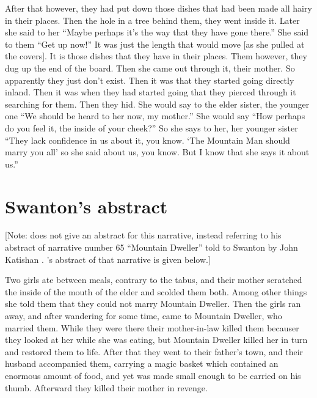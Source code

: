 \begin{pairs}
\begin{Rightside}
After that however, they had put down those dishes that had been made all hairy in their places.
Then the hole in a tree behind them, they went inside it.
\pend
\pstart
{}Later she said to her
\qqk{}“Maybe perhaps it’s the way that they have gone there.”
She said to them
\qqk{}“Get up now!”
It was just the length that would move [as she pulled at the covers].
It is those dishes that they have in their places.
Them however, they dug up the end of the board.
Then she came out through it, their mother.
So apparently they just don’t exist.
Then it was that they started going directly inland.
Then it was when they had started going that they pierced through it searching for them.
Then they hid.
She would say to the elder sister, the younger one
\qqk{}“We should be heard to her now, my mother.”
She would say
“How perhaps do you feel it, the inside of your cheek?”
So she says to her, her younger sister
\qqk{}“They lack confidence in us about it, you know.
\qqk{}‘The Mountain Man should marry you all’
so she said about us, you know.
But I know that she says it about us.”
\pend
\pstart
\pend
\endnumbering
\end{Rightside}
\end{pairs}
\Columns


\section{Swanton’s abstract}\label{sec:92-swanton-abstract}

{}[Note: \citeauthor{swanton:1909} does not give an abstract for this narrative, instead referring to his abstract of narrative number 65 “Mountain Dweller” told to Swanton by  John Katishan \parencite[222–224]{swanton:1909}.
\citeauthor{swanton:1909}’s abstract of that narrative \parencite[441]{swanton:1909} is given below.]

Two girls ate between meals, contrary to the tabus, and their mother scratched the inside of the mouth of the elder and scolded them both.
Among other things she told them that they could not marry Mountain Dweller.
Then the girls ran away, and after wandering for some time, came to Mountain Dweller, who married them.
While they were there their mother-in-law killed them becauser they looked at her while she was eating, but Mountain Dweller killed her in turn and restored them to life.
After that they went to their father’s town, and their husband accompanied them, carrying a magic basket which contained an enormous amount of food, and yet was made small enough to be carried on his thumb.
Afterward they killed their mother in revenge.


